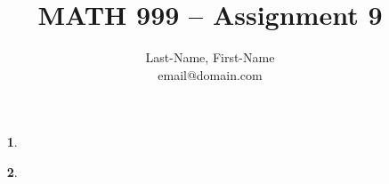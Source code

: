 \newcommand{\preamblefolder}{./include}       %

\usepackage[enable]{easy-todo}                %

\title{MATH 999 -- Assignment 9}
\author{
  Last-Name, First-Name\\
  {\selectfont email@domain.com}
}


  \maketitle

    \begin{enumerate}
      \item[\textbf{1}.]
      
        \aspace
      
      \qspace

      \item[\textbf{2}.]
      
        \aspace

      
      
    \end{enumerate}


  \begin{bibdiv}
    \begin{biblist}
    \end{biblist}
  \end{bibdiv}

  \listoftodos


